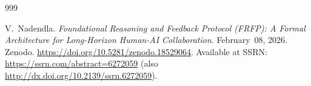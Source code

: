

% 



\begin{thebibliography}{999}

V.~Nadendla.
\newblock \emph{Foundational Reasoning and Feedback Protocol (FRFP): A Formal Architecture for Long-Horizon Human-AI Collaboration}.
\newblock February~08, 2026.
\newblock Zenodo. \newblock \url{https://doi.org/10.5281/zenodo.18529064}.
\newblock Available at SSRN: \url{https://ssrn.com/abstract=6272059} (also \url{http://dx.doi.org/10.2139/ssrn.6272059}).
\end{thebibliography}